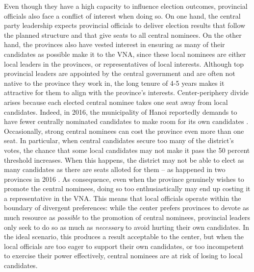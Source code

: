 \documentclass[12pt]{article}\usepackage[]{graphicx}\usepackage[]{color}
\newcommand{\1}{\mathbbm{1}}
\begin{document}
Even though they have a high capacity to influence election outcomes, provincial officials also face a conflict of interest when doing so. On one hand, the central party leadership expects provincial officials to deliver election results that follow the planned structure and that give seats to all central nominees. On the other hand, the provinces also have vested interest in ensuring as many of their candidates as possible make it to the VNA, since these local nominees are either local leaders in the provinces, or representatives of local interests. Although top provincial leaders are appointed by the central government and are often not native to the province they work in, the long tenure of 4-5 years makes it attractive for them to align with the province's interests. Center-periphery divide arises because each elected central nominee takes one seat away from local candidates. Indeed, in 2016, the municipality of Hanoi reportedly demands to have fewer centrally nominated candidates to make room for its own candidates \citep{vnexpress2016_2}. Occasionally, strong central nominees can cost the province even more than one seat. In particular, when central candidates secure too many of the district's votes, the chance that some local candidates may not make it pass the 50 percent threshold increases. When this happens, the district may not be able to elect as many candidates as there are seats alloted for them -- as happened in two provinces in 2016 \citep{vnexpress2016}. As consequence, even when the province genuinely wishes to promote the central nominees, doing so too enthusiastically may end up costing it a representative in the VNA. This means that local officials operate within the boundary of divergent preferences: while the center prefers provinces to devote as much resource as \textit{possible} to the promotion of central nominees, provincial leaders only seek to do so as much as \textit{necessary} to avoid hurting their own candidates. In the ideal scenario, this produces a result acceptable to the center, but when the local officials are too eager to support their own candidates, or too incompetent to exercise their power effectively, central nominees are at risk of losing to local candidates.
\end{document}
